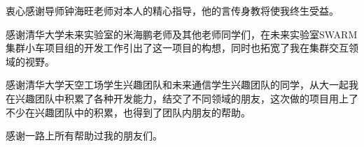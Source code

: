 \begin{acknowledgement}
  衷心感谢导师钟海旺老师对本人的精心指导，他的言传身教将使我终生受益。


  感谢清华大学未来实验室的米海鹏老师及其他老师同学们，在未来实验室SWARM集群小车项目组的开发工作引出了这一项目的构想，同时也拓宽了我在集群交互领域的视野。

  感谢清华大学天空工场学生兴趣团队和未来通信学生兴趣团队的同学，从大一起我在兴趣团队中积累了各种开发能力，结交了不同领域的朋友，这次做的项目用上了不少在兴趣团队中的积累，也得到了团队内朋友的帮助。

  感谢一路上所有帮助过我的朋友们。

\end{acknowledgement}
